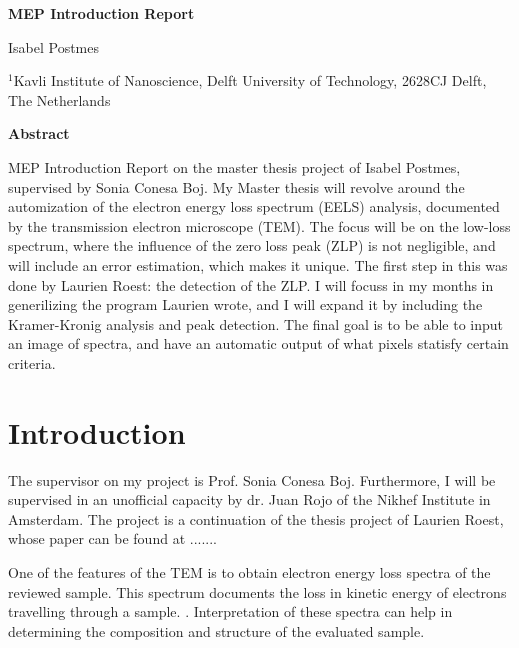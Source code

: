 \documentclass[12pt,a4paper]{article}
\numberwithin{equation}{section}
\numberwithin{figure}{section}
\numberwithin{table}{section}
\begin{document}




\begin{center}
  {\Large \bf MEP Introduction Report}
\vspace{1.4cm}

Isabel Postmes

\vspace{1.0cm}
 
{\it \small

$^{1}$Kavli Institute of Nanoscience, Delft University of Technology, 2628CJ Delft, The
  Netherlands\\[0.1cm]

}

\vspace{1.0cm}

{\bf \large Abstract}

\end{center}

MEP Introduction Report on the master thesis project of Isabel Postmes, supervised by Sonia Conesa Boj.
My Master thesis will revolve around the automization of the electron energy loss spectrum (EELS) analysis, documented by the transmission electron microscope (TEM). The focus will be on the low-loss spectrum, where the influence of the zero loss peak (ZLP) is not negligible, and will include an error estimation, which makes it unique. The first step in this was done by Laurien Roest: the detection of the ZLP. I will focuss in my months in generilizing the program Laurien wrote, and I will expand it by including the Kramer-Kronig analysis and peak detection. The final goal is to be able to input an image of spectra, and have an automatic output of what pixels statisfy certain criteria. 



\clearpage
\tableofcontents

\newpage
\section{Introduction}
The supervisor on my project is Prof. Sonia Conesa Boj. Furthermore, I will be supervised in an unofficial capacity by dr. Juan Rojo of the Nikhef Institute in Amsterdam. The project is a continuation of the thesis project of Laurien Roest, whose paper can be found at .......



One of the features of the TEM is to obtain electron energy loss spectra of the reviewed sample. This spectrum documents the loss in kinetic energy of electrons travelling through a sample. \cite{egerton_article}. Interpretation of these spectra can help in determining the composition and structure of the evaluated sample. 
\end{document}
